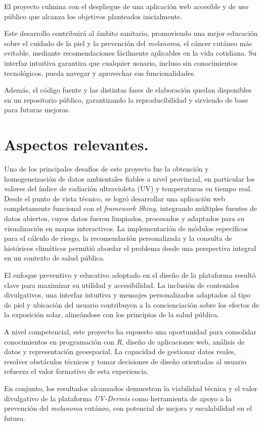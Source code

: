 
El proyecto culmina con el despliegue de una aplicación web accesible y de uso público que alcanza los objetivos planteados inicialmente. 

Este desarrollo contribuirá al ámbito sanitario, promoviendo una mejor educación sobre el cuidado de la piel y la prevención del \textit{melanoma}, el cáncer cutáneo más evitable, mediante recomendaciones fácilmente aplicables en la vida cotidiana. Su interfaz intuitiva garantiza que cualquier usuario, incluso sin conocimientos tecnológicos, pueda navegar y aprovechar sus funcionalidades.

Además, el código fuente y las distintas fases de elaboración quedan disponibles en un repositorio público, garantizando la reproducibilidad y sirviendo de base para futuras mejoras.

\section{Aspectos relevantes.}

Uno de los principales desafíos de este proyecto fue la obtención y homogeneización de datos ambientales fiables a nivel provincial, en particular los valores del índice de radiación ultravioleta (UV) y temperaturas en tiempo real.  Desde el punto de vista técnico, se logró desarrollar una aplicación web completamente funcional con el \textit{framework Shiny}, integrando múltiples fuentes de datos abiertos, cuyos datos fueron limpiados, procesados y adaptados para su visualización en mapas interactivos. La implementación de módulos específicos para el cálculo de riesgo, la recomendación personalizada y la consulta de históricos climáticos permitió abordar el problema desde una perspectiva integral en un contexto de salud pública.

El enfoque preventivo y educativo adoptado en el diseño de la plataforma resultó clave para maximizar su utilidad y accesibilidad. La inclusión de contenidos divulgativos, una interfaz intuitiva y mensajes personalizados adaptados al tipo de piel y ubicación del usuario contribuyen a la concienciación sobre los efectos de la exposición solar, alineándose con los principios de la salud pública.

A nivel competencial, este proyecto ha supuesto una oportunidad para consolidar conocimientos en programación con \textit{R}, diseño de aplicaciones web, análisis de datos y representación geoespacial. La capacidad de gestionar datos reales, resolver obstáculos técnicos y tomar decisiones de diseño orientadas al usuario refuerza el valor formativo de esta experiencia.

En conjunto, los resultados alcanzados demuestran la viabilidad técnica y el valor divulgativo de la plataforma \textit{UV-Dermis} como herramienta de apoyo a la prevención del \textit{melanoma} cutáneo, con potencial de mejora y escalabilidad en el futuro.
